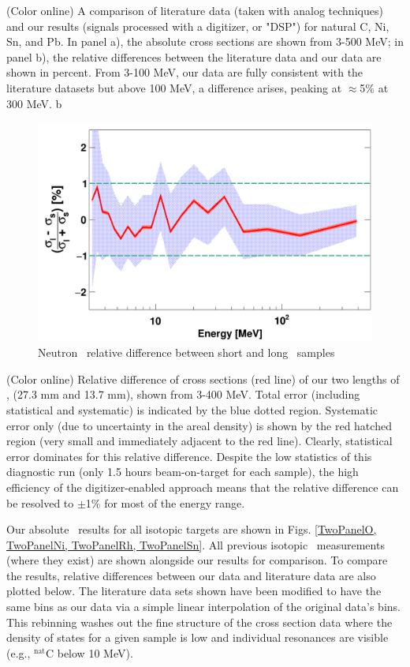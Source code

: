(Color online) A comparison of literature data (taken with analog
    techniques) and our results (signals processed with a digitizer, or "DSP")
    for natural C, Ni, Sn, and Pb. In panel a), the absolute cross sections are shown from
    3-500 MeV; in panel b), the relative differences between the literature data and
    our data are shown in percent. From 3-100 MeV, our data are fully consistent with the
    literature datasets but above 100 MeV, a difference arises, peaking at
    $\approx$5\% at 300 MeV.
b

\begin{figure}
    \includegraphics[scale=0.30]{figures/relativeDiff_longCarbonShortCarbon.png}
    \caption{Neutron \tot\ relative difference between short and long \cNat\ samples}
    \label{CarbonBenchmarking}
\end{figure}

(Color online) Relative difference of cross sections (red line) of
        our two lengths of \cNat, (27.3 mm and 13.7 mm), shown from 3-400
        MeV. Total error
        (including statistical and systematic) is indicated by the blue
        dotted region. Systematic error only (due to uncertainty in the areal
        density) is shown by the red hatched region (very small and immediately adjacent to 
        the red line). Clearly, statistical error dominates for this relative
        difference.
        Despite the low statistics of this diagnostic run (only 1.5 hours
        beam-on-target for each sample), the high efficiency of the
        digitizer-enabled approach means that the relative difference can be resolved to 
        $\pm$1\% for most of the energy range.


Our absolute \tot\ results for all isotopic targets are shown in Figs.
\ref{TwoPanelO, TwoPanelNi, TwoPanelRh, TwoPanelSn}. All previous isotopic \tot\
measurements (where they exist) are shown alongside our results for comparison.
To compare the results, relative differences between our data and literature
data are also plotted below. The literature
data sets shown have been modified to have the same bins as our data via a simple
linear interpolation of the original data's bins. This rebinning
washes out the fine structure of the cross section data where the density of states
for a given sample is low and individual resonances are visible
(e.g., $^{\text{nat}}$C below 10 MeV).

